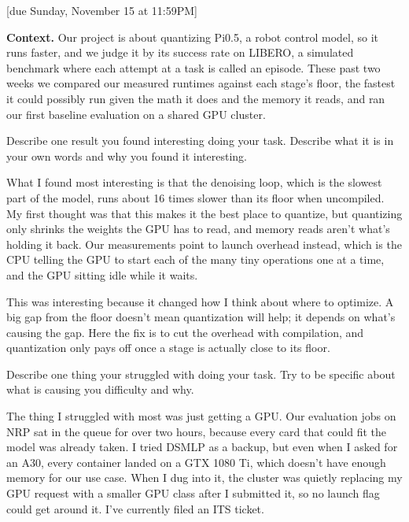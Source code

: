 \documentclass{article}
\begin{document}
[due Sunday, November 15 at 11:59PM]

\noindent\textbf{Context.} Our project is about quantizing Pi0.5, a robot control model, so it runs faster, and we judge it by its success rate on LIBERO, a simulated benchmark where each attempt at a task is called an episode. These past two weeks we compared our measured runtimes against each stage's floor, the fastest it could possibly run given the math it does and the memory it reads, and ran our first baseline evaluation on a shared GPU cluster.

\begin{probset}
\begin{prob}
    Describe one result you found interesting doing your task. Describe what it is in your own words and why you found it interesting.

    \begin{soln}
        What I found most interesting is that the denoising loop, which is the slowest part of the model, runs about 16 times slower than its floor when uncompiled. My first thought was that this makes it the best place to quantize, but quantizing only shrinks the weights the GPU has to read, and memory reads aren't what's holding it back. Our measurements point to launch overhead instead, which is the CPU telling the GPU to start each of the many tiny operations one at a time, and the GPU sitting idle while it waits.

        This was interesting because it changed how I think about where to optimize. A big gap from the floor doesn't mean quantization will help; it depends on what's causing the gap. Here the fix is to cut the overhead with compilation, and quantization only pays off once a stage is actually close to its floor.
    \end{soln}
\end{prob}

\begin{prob}
    Describe one thing your struggled with doing your task. Try to be specific about what is causing you difficulty and why.

    \begin{soln}
        The thing I struggled with most was just getting a GPU. Our evaluation jobs on NRP sat in the queue for over two hours, because every card that could fit the model was already taken. I tried DSMLP as a backup, but even when I asked for an A30, every container landed on a GTX 1080 Ti, which doesn't have enough memory for our use case. When I dug into it, the cluster was quietly replacing my GPU request with a smaller GPU class after I submitted it, so no launch flag could get around it. I've currently filed an ITS ticket.
    \end{soln}
\end{prob}


\end{probset}
\end{document}
